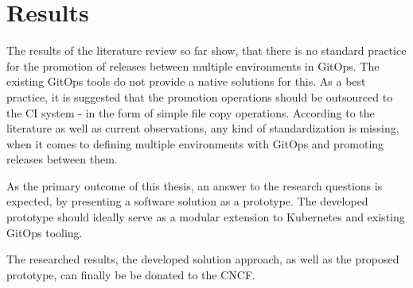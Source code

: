 \chapter{Results}

The results of the literature review so far show,
that there is no standard practice for the promotion of releases between multiple environments in GitOps.
The existing GitOps tools do not provide
a native solutions for this.
As a best practice, it is suggested that the promotion operations
should be outsourced to the CI system
- in the form of simple file copy operations.
According to the literature as well as current observations,
any kind of standardization is missing,
when it comes to defining multiple environments with GitOps
and promoting releases between them.
\bigskip

\noindent
As the primary outcome of this thesis,
an answer to the research questions is expected,
by presenting a software solution as a prototype.
The developed prototype should ideally serve as a 
modular extension to Kubernetes and existing GitOps tooling.
\bigskip

%

\noindent
The researched results,
the developed solution approach,
as well as the proposed prototype,
can finally be
be donated to the CNCF.
